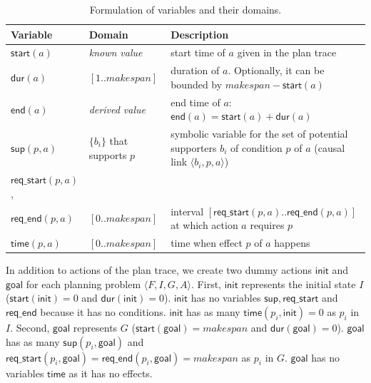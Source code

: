 \documentclass[runningheads]{llncs}
\newcommand{\tup}[1]{{\langle #1 \rangle}}
\newcommand{\dur}{\mathsf{dur}}    %
\newcommand{\start}{\mathsf{start}}%
\newcommand{\en}{\mathsf{end}}     %
\newcommand{\supp}{\mathsf{sup}}   %
\newcommand{\tim}{\mathsf{time}}   %
\newcommand{\reqs}{\mathsf{req\_{start}}} %
\newcommand{\reqe}{\mathsf{req\_{end}}}   %
\newcommand{\ini}{\mathsf{init}}   %
\newcommand{\goal}{\mathsf{goal}}  %
\begin{document}
\begin{table}
\begin{center}
\small
\begin{tabular}{p{2cm}p{2.7cm}p{7.4cm}}
\textbf{Variable} & \textbf{Domain} & \textbf{Description} \\

\hline


$\start(a)$ & \emph{known value} & start time of $a$ given in the plan trace \\
$\dur(a)$ & $[1..makespan]$ & duration of $a$. Optionally, it can be bounded by $makespan-\start(a)$\\
$\en(a)$ & \emph{derived value} & end time of $a$: $\en(a)=\start(a)+\dur(a)$ \\


$\supp(p,a)$ & $\{b_i\}$ that \newline supports $p$ & symbolic variable for the set of potential supporters $b_i$ of condition $p$ of $a$ (causal link $\tup{b_i,p,a}$) \\

$\reqs(p,a)$, \\
$\reqe(p,a)$ & $[0..makespan]$ & interval $[\reqs(p,a)..\reqe(p,a)]$ at which action $a$ requires $p$ \\

$\tim(p,a)$ & $[0..makespan]$ & time when effect $p$ of $a$ happens \\


\hline
\end{tabular}
\normalsize
\end{center}
\caption{Formulation of variables and their domains.}
\label{table:variables}
\end{table}


In addition to actions of the plan trace, we create two dummy actions $\ini$ and $\goal$ for each planning problem $\tup{F,I,G,A}$. First,
$\ini$ represents the initial state $I$ ($\start(\ini)=0$ and $\dur(\ini)=0$). $\ini$ has no variables $\supp, \reqs$ and $\reqe$ because it has no conditions. $\ini$ has as many $\tim(p_i,\ini)=0$ as $p_i$ in $I$.
Second, $\goal$ represents $G$ ($\start(\goal)=makespan$ and $\dur(\goal)=0$). $\goal$ has as many $\supp(p_i,\goal)$ and $\reqs(p_i,\goal)=\reqe(p_i,\goal)=makespan$ as $p_i$ in $G$. $\goal$ has no variables $\tim$ as it has no effects.
\end{document}
